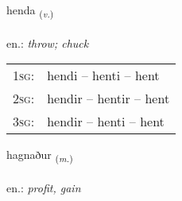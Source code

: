 \documentclass[frontgrid, backgrid]{flacards}\usepackage[]{graphicx}\usepackage[]{xcolor}
\begin{document}
\renewcommand{\flhead}{\vskip5pt \fboxsep=0pt {\small\bfseries\footnotesize Sagnorð | Verb}}
\renewcommand{\fcfoot}{\vskip5pt \fboxsep=0pt \hspace{2pt}{\small\bfseries\footnotesize 2K}}

\renewcommand{\blhead}{\vskip5pt {\small\bfseries\footnotesize Sagnorð | Verb }}
\renewcommand{\bcfoot}{\vskip5pt \hspace{2pt}{\small\bfseries\footnotesize 2K}}


{henda \small{\textsubscript{(\textit{v.})}} \\[1ex] %
\textphonetic{[hɛnta]} \\
en.: \emph{throw; chuck} \\  [2ex]
\renewcommand*{\arraystretch}{0.8}
\begin{tabular}{p{1cm}l}
\textsc{1sg}: & hendi -- henti -- hent \\ 
\textsc{2sg}: & hendir -- hentir -- hent \\ 
\textsc{3sg}: & hendir -- henti -- hent \\ 
\end{tabular}
}

\renewcommand{\flhead}{\vskip5pt \fboxsep=0pt {\small\bfseries\footnotesize Nafnorð | Noun}}
\renewcommand{\fcfoot}{\vskip5pt \fboxsep=0pt \hspace{2pt}{\small\bfseries\footnotesize 2K}}

\renewcommand{\blhead}{\vskip5pt {\small\bfseries\footnotesize Nafnorð | Noun }}
\renewcommand{\bcfoot}{\vskip5pt \hspace{2pt}{\small\bfseries\footnotesize 2K}}


{hagnaður \small{\textsubscript{(\textit{m.})}} \\[1ex] %
\textphonetic{[haknaðʏr]} \\
en.: \emph{profit, gain} \\  [2ex]
\renewcommand*{\arraystretch}{0.8}
}
\end{document}
